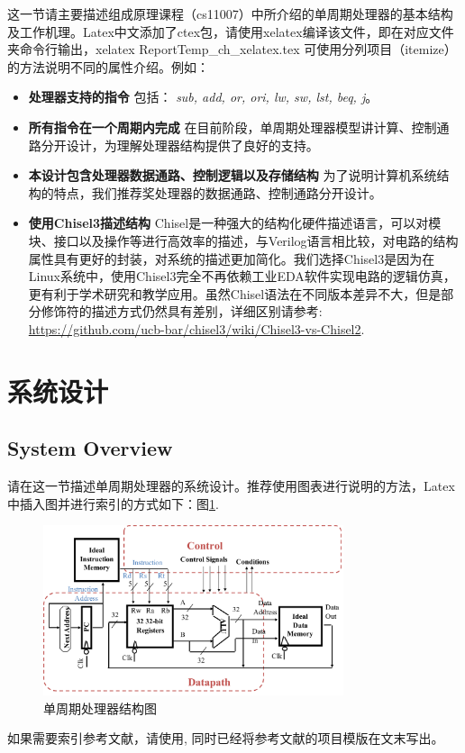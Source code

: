 \documentclass[a4paper]{article}
\begin{document}
这一节请主要描述组成原理课程（cs11007）中所介绍的单周期处理器的基本结构及工作机理。Latex中文添加了ctex包，请使用xelatex编译该文件，即在对应文件夹命令行输出，xelatex ReportTemp\_ch\_xelatex.tex
可使用分列项目（itemize）的方法说明不同的属性介绍。例如：
\begin{itemize}
	\item{\textbf{处理器支持的指令} 包括： \emph{sub, add, or, ori, lw, sw, lst, beq, j}。}
    \item{\textbf{所有指令在一个周期内完成} 在目前阶段，单周期处理器模型讲计算、控制通路分开设计，为理解处理器结构提供了良好的支持。}
    \item{\textbf{本设计包含处理器数据通路、控制逻辑以及存储结构} 为了说明计算机系统结构的特点，我们推荐奖处理器的数据通路、控制通路分开设计。}
    \item{\textbf{使用Chisel3描述结构} Chisel是一种强大的结构化硬件描述语言，可以对模块、接口以及操作等进行高效率的描述，与Verilog语言相比较，对电路的结构属性具有更好的封装，对系统的描述更加简化。我们选择Chisel3是因为在Linux系统中，使用Chisel3完全不再依赖工业EDA软件实现电路的逻辑仿真，更有利于学术研究和教学应用。虽然Chisel语法在不同版本差异不大，但是部分修饰符的描述方式仍然具有差别，详细区别请参考: \url{https://github.com/ucb-bar/chisel3/wiki/Chisel3-vs-Chisel2}.}
\end{itemize}


\newpage
\section{系统设计} \label{sysdes}%
\subsection{System Overview}\label{sub:sysover}
请在这一节描述单周期处理器的系统设计。推荐使用图表进行说明的方法，Latex中插入图并进行索引的方式如下：图\ref{fig:singleblock}. 
\begin{figure}[ht]
 \centering
 \includegraphics[height=5cm]{images/l1sys.pdf}
 \caption{单周期处理器结构图}
 \label{fig:singleblock}
\end{figure}
如果需要索引参考文献，请使用\cite{Erdos01}, 同时已经将参考文献的项目模版在文末写出。
\end{document}
